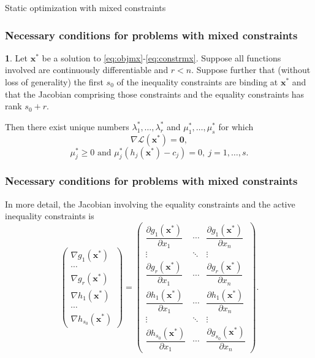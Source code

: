 \documentclass[10pt]{beamer}
\theoremstyle{definition}
\newtheorem{Fact}{\translate{Fact}}
\begin{document}
\begin{section}{Static optimization with mixed constraints}
\begin{frame}[fragile]
\frametitle{Necessary conditions for problems with mixed constraints}
\begin{Fact}
Let $ \mathbf{x^*} $ be a solution to \eqref{eq:objmx}-\eqref{eq:constrmx}. Suppose all functions involved are continuously differentiable and $ r<n $. Suppose further that (without loss of generality) the first $ s_0 $ of the inequality constraints are binding at $ \mathbf{x^*} $ and that the Jacobian comprising those constraints and the equality constraints has rank $ s_0+r $.

Then there exist unique numbers $ \lambda_1^*,\ldots,\lambda_r^* $ and $ \mu_1^*,\ldots,\mu_s^* $ for which \[ \nabla \mathcal{L}(\mathbf{x^*}) = \mathbf{0}, \]
\[ \mu_j^* \geq 0 \text{ and } \mu_j^* (h_j(\mathbf{x^*})-c_j) = 0,~j=1,\ldots,s. \]
\label{fc:Nsmx}
\end{Fact}
\end{frame}

\begin{frame}[fragile]
\frametitle{Necessary conditions for problems with mixed constraints}
In more detail, the Jacobian involving the equality constraints and the active inequality constraints is \[ \begin{pmatrix}
\nabla g_1(\mathbf{x^*})\\
\cdots \\
\nabla g_r(\mathbf{x^*})\\
\nabla h_1(\mathbf{x^*})\\
\cdots \\
\nabla h_{s_0}(\mathbf{x^*})
\end{pmatrix} = \begin{pmatrix}
\dfrac{\partial g_1 (\mathbf{x^*})}{\partial x_1}  &  \cdots  &  \dfrac{\partial g_1 (\mathbf{x^*})}{\partial x_n} \\
\vdots   &  \ddots  &  \vdots \\
\dfrac{\partial g_{r} (\mathbf{x^*})}{\partial x_1}  &  \cdots  &  \dfrac{\partial g_{r} (\mathbf{x^*})}{\partial x_n}\\
\dfrac{\partial h_1 (\mathbf{x^*})}{\partial x_1}  &  \cdots  &  \dfrac{\partial h_1 (\mathbf{x^*})}{\partial x_n} \\
\vdots   &  \ddots  &  \vdots \\
\dfrac{\partial h_{s_0} (\mathbf{x^*})}{\partial x_1}  &  \cdots  &  \dfrac{\partial g_{s_0} (\mathbf{x^*})}{\partial x_n}
\end{pmatrix}. \] 


\end{frame}
\end{section}
\end{document}
